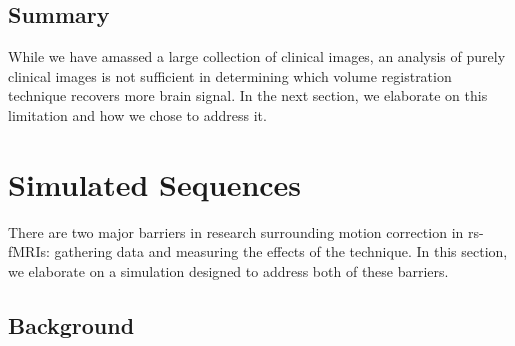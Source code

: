 


\subsection{Summary}

While we have amassed a large collection of clinical images, an analysis of purely clinical images is not sufficient in determining which volume registration technique recovers more brain signal. In the next section, we elaborate on this limitation and how we chose to address it.

\section{Simulated Sequences} %

There are two major barriers in research surrounding motion correction in rs-fMRIs: gathering data and measuring the effects of the technique. In this section, we elaborate on a simulation designed to address both of these barriers.

\subsection{Background}

